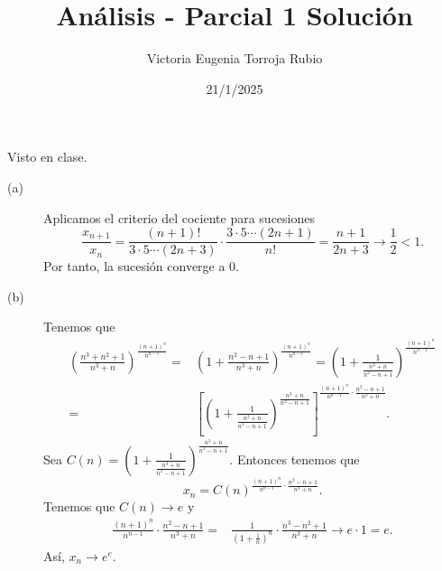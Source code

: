 \documentclass{article}
\begin{document}
\title{Análisis - Parcial 1 Solución}
\author{Victoria Eugenia Torroja Rubio}
\date{21/1/2025}

\maketitle

\begin{sol}
Visto en clase.
\end{sol}

\begin{sol}
\begin{description}
\item[(a)] Aplicamos el criterio del cociente para sucesiones
\[ \frac{x_{n+1}}{x_{n}} = \frac{\left(n+1\right)!}{3 \cdot 5 \cdots \left(2n+3\right)} \cdot \frac{3 \cdot 5 \cdots \left(2n+1\right)}{n!} = \frac{n+1}{2n+3} \to \frac{1}{2} < 1 .\]
Por tanto, la sucesión converge a 0.
\item[(b)] Tenemos que
\[
\begin{split}
	\left(\frac{n^{3}+n^{2}+1}{n^{3}+n}\right)^{\frac{\left(n+1\right)^{n}}{n^{n-1}}} = & \left(1 + \frac{n^{2}-n+1}{n^{3}+n}\right)^{\frac{\left(n+1\right)^{n}}{n^{n-1}}} = \left(1 + \frac{1}{\frac{n^{3}+n}{n^{2}-n+1}}\right)^{\frac{\left(n+1\right)^{n}}{n^{n-1}}}  \\ = & 
	\left[\left(1 + \frac{1}{\frac{n^{3}+n}{n^{2}-n+1}}\right)^{\frac{n^{3}+n}{n^{2}-n+1}}\right]^{\frac{\left(n+1\right)^{n}}{n^{n-1}} \cdot \frac{n^{2}-n+1}{n^{3}+n}} .
\end{split}
\]
Sea $\displaystyle C\left(n\right) = \left(1 + \frac{1}{\frac{n^{3}+n}{n^{2}-n+1}}\right)^{\frac{n^{3}+n}{n^{2}-n+1}} $. Entonces tenemos que 
\[x_{n} = C\left(n\right)^{\frac{\left(n+1\right)^{n}}{n^{n-1}} \cdot \frac{n^{2}-n+1}{n^{3}+n}} .\]
Tenemos que $\displaystyle C\left(n\right) \to e $ y
\[
\begin{split}
	\frac{\left(n+1\right)^{n}}{n^{n-1}} \cdot \frac{n^{2}-n+1}{n^{3}+n} = & \frac{1}{\left(1 + \frac{1}{n}\right)^{n}} \cdot \frac{n^{3}-n^{2} +1}{n^{3}+n} \to e \cdot 1 = e	.
\end{split}
\]
Así, $\displaystyle x_{n} \to e^{e} $.
\end{description}
\end{sol}
\end{document}
